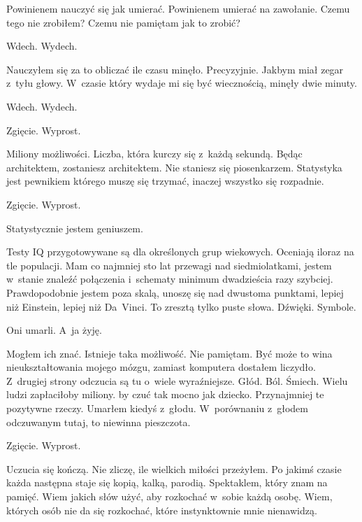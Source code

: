 Powinienem nauczyć się jak umierać. Powinienem umierać na zawołanie. Czemu tego nie zrobiłem? Czemu nie pamiętam jak to zrobić? 

\begin{itquote}
Wdech. Wydech.
\end{itquote}

Nauczyłem się za to obliczać ile czasu minęło. Precyzyjnie. Jakbym miał zegar z~tyłu głowy. W~czasie który wydaje mi się być wiecznością, minęły dwie minuty.

\begin{itquote}
Wdech. Wydech.
\end{itquote}

\begin{itquote}
Zgięcie. Wyprost.
\end{itquote}

Miliony możliwości. Liczba, która kurczy się z~każdą sekundą. Będąc architektem, zostaniesz architektem. Nie staniesz się piosenkarzem. Statystyka jest pewnikiem którego muszę się trzymać, inaczej wszystko się rozpadnie. 

\begin{itquote}
Zgięcie. Wyprost.
\end{itquote}

Statystycznie jestem geniuszem.

Testy IQ przygotowywane są dla określonych grup wiekowych. Oceniają iloraz na tle populacji. Mam co najmniej sto lat przewagi nad siedmiolatkami, jestem w~stanie znaleźć połączenia i~schematy minimum dwadzieścia razy szybciej. Prawdopodobnie jestem poza skalą, unoszę się nad dwustoma punktami, lepiej niż Einstein, lepiej niż Da~Vinci. To zresztą tylko puste słowa. Dźwięki. Symbole. 

Oni umarli. A~ja żyję.

Mogłem ich znać. Istnieje taka możliwość. Nie pamiętam. Być może to wina nieukształtowania mojego mózgu, zamiast komputera dostałem liczydło. Z~drugiej strony odczucia są tu o~wiele wyraźniejsze. Głód. Ból. Śmiech. Wielu ludzi zapłaciłoby miliony. by czuć tak mocno jak dziecko. Przynajmniej te pozytywne rzeczy. Umarłem kiedyś z~głodu. W~porównaniu z~głodem odczuwanym tutaj, to niewinna pieszczota.

\begin{itquote}
Zgięcie. Wyprost.
\end{itquote}

Uczucia się kończą. Nie zliczę, ile wielkich miłości przeżyłem. Po jakimś czasie każda następna staje się kopią, kalką, parodią. Spektaklem, który znam na pamięć. Wiem jakich słów użyć, aby rozkochać w~sobie każdą osobę. Wiem, których osób nie da się rozkochać, które instynktownie mnie nienawidzą.

